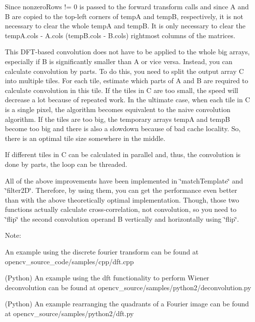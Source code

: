 \begin{DoxyItemize}
\item Since {\ttfamily nonzero\+Rows != 0} is passed to the forward transform calls and since {\ttfamily A} and {\ttfamily B} are copied to the top-\/left corners of {\ttfamily tempA} and {\ttfamily tempB}, respectively, it is not necessary to clear the whole {\ttfamily tempA} and {\ttfamily tempB}. It is only necessary to clear the {\ttfamily temp\+A.\+cols -\/ A.\+cols} ({\ttfamily temp\+B.\+cols -\/ B.\+cols}) rightmost columns of the matrices. 
\item This D\+F\+T-\/based convolution does not have to be applied to the whole big arrays, especially if {\ttfamily B} is significantly smaller than {\ttfamily A} or vice versa. Instead, you can calculate convolution by parts. To do this, you need to split the output array {\ttfamily C} into multiple tiles. For each tile, estimate which parts of {\ttfamily A} and {\ttfamily B} are required to calculate convolution in this tile. If the tiles in {\ttfamily C} are too small, the speed will decrease a lot because of repeated work. In the ultimate case, when each tile in {\ttfamily C} is a single pixel, the algorithm becomes equivalent to the naive convolution algorithm. If the tiles are too big, the temporary arrays {\ttfamily tempA} and {\ttfamily tempB} become too big and there is also a slowdown because of bad cache locality. So, there is an optimal tile size somewhere in the middle. 
\item If different tiles in {\ttfamily C} can be calculated in parallel and, thus, the convolution is done by parts, the loop can be threaded. 
\end{DoxyItemize}

All of the above improvements have been implemented in \char`\"{}match\+Template\char`\"{} and \char`\"{}filter2\+D\char`\"{}. Therefore, by using them, you can get the performance even better than with the above theoretically optimal implementation. Though, those two functions actually calculate cross-\/correlation, not convolution, so you need to \char`\"{}flip\char`\"{} the second convolution operand {\ttfamily B} vertically and horizontally using \char`\"{}flip\char`\"{}.

Note\+:


\begin{DoxyItemize}
\item An example using the discrete fourier transform can be found at opencv\+\_\+source\+\_\+code/samples/cpp/dft.\+cpp 
\item (Python) An example using the dft functionality to perform Wiener deconvolution can be found at opencv\+\_\+source/samples/python2/deconvolution.\+py 
\item (Python) An example rearranging the quadrants of a Fourier image can be found at opencv\+\_\+source/samples/python2/dft.\+py 
\end{DoxyItemize}


